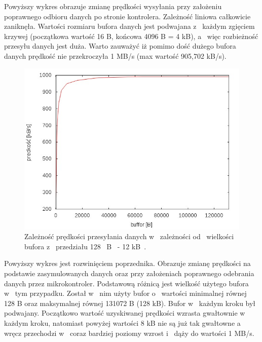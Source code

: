 \documentclass{BscUS}
\begin{document}
\noindent Powyższy wykres obrazuje zmianę prędkości wysyłania przy założeniu poprawnego odbioru danych po stronie kontrolera. Zależność liniowa całkowicie zaniknęła. Wartości rozmiaru bufora danych jest podwajana z~ każdym zgięciem krzywej (początkowa wartość 16 B, końcowa 4096 B = 4 kB), a~ więc rozbieżność przesyłu danych jest duża. Warto zauważyć iż pomimo dość dużego bufora danych prędkość nie przekroczyła 1 MB/s (max wartość 905,702 kB/s).
\begin{figure}[H]
{
\centering
\captionsetup{justification=centering}
\includegraphics[width=1\textwidth]{./img/S_bbuf2}
\caption{Zależność prędkości przesyłania danych w~ zależności od~ wielkości bufora z~ przedziału 128~ B~ - 12 kB~.}
\label{fig:S_bbuf2}
}
\end{figure}
\noindent Powyższy wykres jest rozwinięciem poprzednika. Obrazuje zmianę prędkości na podstawie zasymulowanych danych oraz przy założeniach poprawnego odebrania danych przez mikrokontroler. Podstawową różnicą jest wielkość użytego bufora w~ tym przypadku. Został w~ nim użyty bufor o~ wartości minimalnej równej 128 B oraz maksymalnej równej 131072 B (128 kB). Bufor w~ każdym kroku był podwajany. Początkowo wartość uzyskiwanej prędkości wzrasta gwałtownie w~ każdym kroku, natomiast powyżej wartości 8 kB nie są już tak gwałtowne a~ wręcz przechodzi w~ coraz bardziej poziomy wzrost i~ dąży do wartości 1 MB/s. 
\newline
\end{document}
